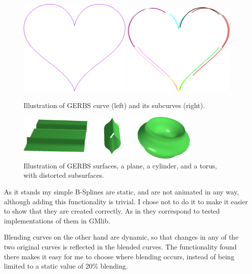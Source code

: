 \documentclass[a4paper,12pt]{extarticle}
\begin{document}
\begin{figure}[H]
  \centering
  \includegraphics[width=0.49\textwidth]{GERBSCurve.png}
  \includegraphics[width=0.49\textwidth]{LocalCurves.png}
  \caption{Illustration of GERBS curve (left) and its subcurves (right).}
  \label{fig:GERBSCurve}
\end{figure}

\begin{figure}[H]
\centering
\includegraphics[width=0.8\textwidth]{GERBSSurfaces.png}
\caption{Illustration of GERBS surfaces, a plane, a cylinder, and a torus, with distorted subsurfaces.}
\label{fig:GERBSSurface}
\end{figure}

As it stands my simple B-Splines are static, and are not animated in any way, although adding this functionality is trivial. I chose not to do it to make it easier to show that they are created correctly. As in they correspond to tested implementations of them in GMlib.

Blending curves on the other hand are dynamic, so that changes in any of the two original curves is reflected in the blended curves. The functionality found there makes it easy for me to choose where blending occurs, instead of being limited to a static value of 20\% blending.
\end{document}
